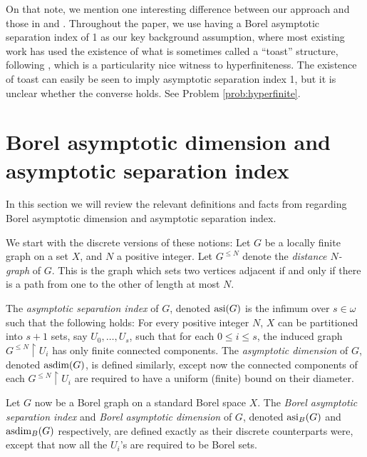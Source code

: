 \documentclass[10pt,a4paper]{article}
\newcommand{\0}{\varnothing}
\newcommand{\asdim}{\textnormal{asdim}}
\newcommand{\asi}{\textnormal{asi}}
\newcommand{\res}{\upharpoonright}
\begin{document}
On that note, we mention one interesting difference between our approach and those in \cite{GR} and \cite{BHT}. Throughout the paper, we use having a Borel asymptotic separation index of 1 as our key background assumption, where most existing work has used the existence of what is sometimes called a ``toast'' structure, following \cite{toast}, which is a particularity nice witness to hyperfiniteness. The existence of toast can easily be seen to imply asymptotic separation index 1, but it is unclear whether the converse holds. See Problem \ref{prob:hyperfinite}.


\section{Borel asymptotic dimension and asymptotic separation index}\label{sec:dim}


In this section we will review the relevant definitions and facts from \cite{dim} regarding Borel asymptotic dimension and asymptotic separation index. 

We start with the discrete versions of these notions: Let $G$ be a locally finite graph on a set $X$, and $N$ a positive integer. Let $G^{\leq N}$ denote the \textit{distance $N$-graph} of $G$. This is the graph which sets two vertices adjacent if and only if there is a path from one to the other of length at most $N$.

The \textit{asymptotic separation index} of $G$, denoted $\asi(G)$ is the infimum over $s \in \omega$ such that the following holds: For every positive integer $N$, $X$ can be partitioned into $s+1$ sets, say $U_0,\ldots,U_s$, such that for each $0 \leq i \leq s$, the induced graph $G^{\leq N} \res U_i$ has only finite connected components. The \textit{asymptotic dimension} of $G$, denoted $\asdim(G)$, is defined similarly, except now the connected components of each $G^{\leq N} \res U_i$ are required to have a uniform (finite) bound on their diameter. 

 Let $G$ now be a Borel graph on a standard Borel space $X$. The \textit{Borel asymptotic separation index} and \textit{Borel asymptotic dimension} of $G$, denoted $\asi_B(G)$ and $\asdim_B(G)$ respectively, are defined exactly as their discrete counterparts were, except that now all the $U_i$'s are required to be Borel sets.
 
\end{document}
